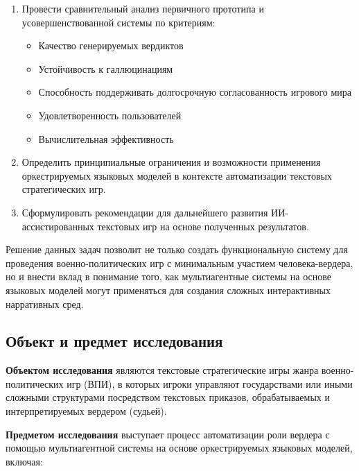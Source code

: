 \begin{enumerate}
    \item Провести сравнительный анализ первичного прототипа и усовершенствованной системы по критериям:
    \begin{itemize}
        \item Качество генерируемых вердиктов
        \item Устойчивость к галлюцинациям
        \item Способность поддерживать долгосрочную согласованность игрового мира
        \item Удовлетворенность пользователей
        \item Вычислительная эффективность
    \end{itemize}

    \item Определить принципиальные ограничения и возможности применения оркестрируемых языковых моделей в контексте автоматизации текстовых стратегических игр.

    \item Сформулировать рекомендации для дальнейшего развития ИИ-ассистированных текстовых игр на основе полученных результатов.
\end{enumerate}

Решение данных задач позволит не только создать функциональную систему для проведения военно-политических игр с минимальным участием человека-вердера, но и внести вклад в понимание того, как мультиагентные системы на основе языковых моделей могут применяться для создания сложных интерактивных нарративных сред.

\subsection{Объект и предмет исследования}

\textbf{Объектом исследования} являются текстовые стратегические игры жанра военно-политических игр (ВПИ), в которых игроки управляют государствами или иными сложными структурами посредством текстовых приказов, обрабатываемых и интерпретируемых вердером (судьей).

\textbf{Предметом исследования} выступает процесс автоматизации роли вердера с помощью мультиагентной системы на основе оркестрируемых языковых моделей, включая:

